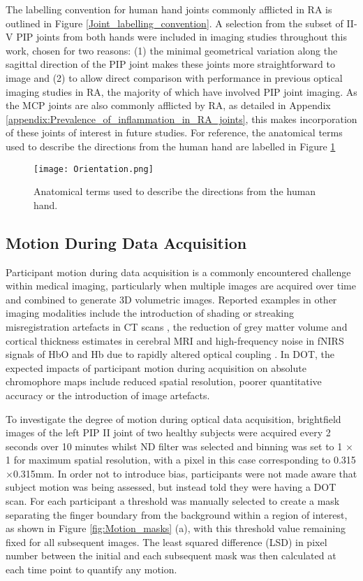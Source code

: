 \documentclass[twoside]{bhamthesis}
\theoremstyle{definition}
\begin{document}
The labelling convention for human hand joints commonly afflicted in RA is outlined in Figure \ref{Joint_labelling_convention}. A selection from the subset of II-V PIP joints from both hands were included in imaging studies throughout this work, chosen for two reasons: (1) the minimal geometrical variation along the sagittal direction of the PIP joint makes these joints more straightforward to image and (2) to allow direct comparison with performance in previous optical imaging studies in RA, the majority of which have involved PIP joint imaging. As the MCP joints are also commonly afflicted by RA, as detailed in Appendix \ref{appendix:Prevalence_of_inflammation_in_RA_joints}, this makes incorporation of these joints of interest in future studies. For reference, the anatomical terms used to describe the directions from the human hand are labelled in Figure \ref{Orientation}

\begin{figure}[!ht]
\centering\texttt{[image: Orientation.png]}
\caption{Anatomical terms used to describe the directions from the human hand.}
\label{Orientation}
\end{figure}

\subsection{Motion During Data Acquisition}
\label{Section:motion}

Participant motion during data acquisition is a commonly encountered challenge within medical imaging, particularly when multiple images are acquired over time and combined to generate 3D volumetric images. Reported examples in other imaging modalities include the introduction of shading or streaking misregistration artefacts in CT scans \cite{barrett2004artifacts}, the reduction of grey matter volume and cortical thickness estimates in cerebral MRI \cite{reuter2015head} and high-frequency noise in fNIRS signals of  HbO and Hb due to rapidly altered optical coupling \cite{cooper2012systematic}. In DOT, the expected impacts of participant motion during acquisition on absolute chromophore maps include reduced spatial resolution, poorer quantitative accuracy or the introduction of image artefacts. 

To investigate the degree of motion during optical data acquisition, brightfield images of the left PIP II joint of two healthy subjects were acquired every 2 seconds over 10 minutes whilst ND filter was selected and binning was set to 1 $\times$ 1 for maximum spatial resolution, with a pixel in this case corresponding to 0.315$\times$0.315mm. In order not to introduce bias, participants were not made aware that subject motion was being assessed, but instead told they were having a DOT scan. For each participant a threshold was manually selected to create a mask separating the finger boundary from the background within a region of interest, as shown in Figure \ref{fig:Motion_masks} (a), with this threshold value remaining fixed for all subsequent images. The least squared difference (LSD) in pixel number between the initial and each subsequent mask was then calculated at each time point to quantify any motion.
\end{document}
